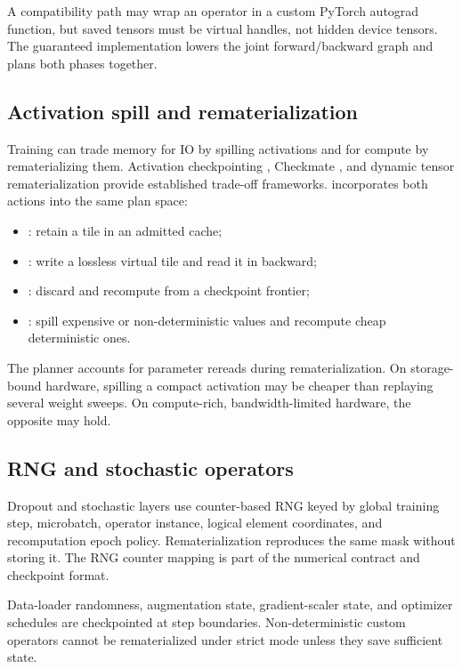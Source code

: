 A compatibility path may wrap an \AMS operator in a custom PyTorch autograd function, but saved tensors must be virtual handles, not hidden device tensors. The guaranteed implementation lowers the joint forward/backward graph and plans both phases together.

\subsection{Activation spill and rematerialization}

Training can trade memory for IO by spilling activations and for compute by rematerializing them. Activation checkpointing \cite{chen2016sublinear}, Checkmate \cite{jain2019checkmate}, and dynamic tensor rematerialization \cite{kirisame2020dtr} provide established trade-off frameworks. \AMS incorporates both actions into the same plan space:

\begin{itemize}
  \item {}: retain a tile in an admitted cache;
  \item {}: write a lossless virtual tile and read it in backward;
  \item {}: discard and recompute from a checkpoint frontier;
  \item {}: spill expensive or non-deterministic values and recompute cheap deterministic ones.
\end{itemize}

The planner accounts for parameter rereads during rematerialization. On storage-bound hardware, spilling a compact activation may be cheaper than replaying several weight sweeps. On compute-rich, bandwidth-limited hardware, the opposite may hold.

\subsection{RNG and stochastic operators}

Dropout and stochastic layers use counter-based RNG keyed by global training step, microbatch, operator instance, logical element coordinates, and recomputation epoch policy. Rematerialization reproduces the same mask without storing it. The RNG counter mapping is part of the numerical contract and checkpoint format.

Data-loader randomness, augmentation state, gradient-scaler state, and optimizer schedules are checkpointed at step boundaries. Non-deterministic custom operators cannot be rematerialized under strict mode unless they save sufficient state.

